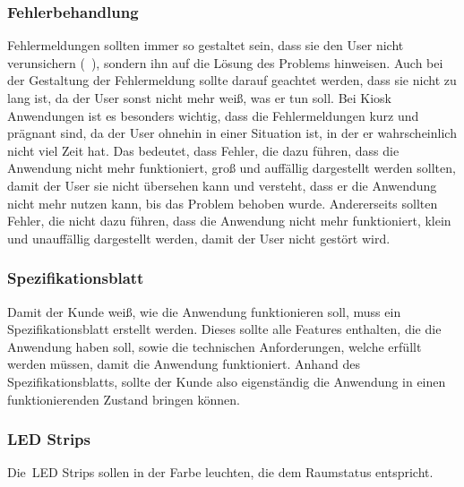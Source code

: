 \subsubsection{Fehlerbehandlung}\label{subsubsec:fehlerbehandlung}
Fehlermeldungen sollten immer so gestaltet sein, dass sie den User nicht verunsichern (~\cite{interaction-design-book1}), sondern ihn auf die Lösung des Problems hinweisen.
Auch bei der Gestaltung der Fehlermeldung sollte darauf geachtet werden, dass sie nicht zu lang ist, da der User sonst nicht mehr weiß, was er tun soll.
Bei Kiosk Anwendungen ist es besonders wichtig, dass die Fehlermeldungen kurz und prägnant sind, da der User ohnehin in einer Situation ist, in der er wahrscheinlich nicht viel Zeit hat.
Das bedeutet, dass Fehler, die dazu führen, dass die Anwendung nicht mehr funktioniert, groß und auffällig dargestellt werden sollten, damit der User sie nicht übersehen kann und versteht, dass er die Anwendung nicht mehr nutzen kann, bis das Problem behoben wurde.
Andererseits sollten Fehler, die nicht dazu führen, dass die Anwendung nicht mehr funktioniert, klein und unauffällig dargestellt werden, damit der User nicht gestört wird.
\subsubsection{Spezifikationsblatt}\label{subsubsec:spezifikationsblatt}
Damit der Kunde weiß, wie die Anwendung funktionieren soll, muss ein Spezifikationsblatt erstellt werden.
Dieses sollte alle Features enthalten, die die Anwendung haben soll, sowie die technischen Anforderungen, welche erfüllt werden müssen, damit die Anwendung funktioniert.
Anhand des Spezifikationsblatts, sollte der Kunde also eigenständig die Anwendung in einen funktionierenden Zustand bringen können.
\subsubsection{LED Strips}\label{subsubsec:led-strips}
Die~\gls{LED Strips} sollen in der Farbe leuchten, die dem Raumstatus entspricht.

